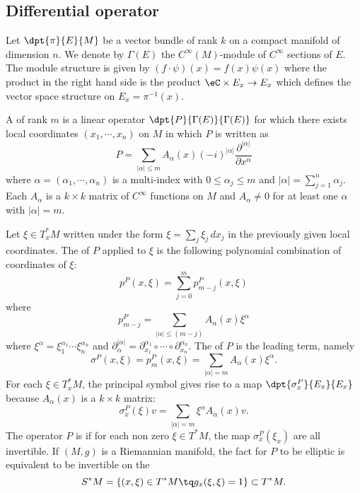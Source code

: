 \subsection{Differential operator}

Let $\dpt{ \pi }{ E }{ M }$ be a vector bundle of rank $k$ on a compact manifold of dimension $n$. We denote by $\Gamma(E)$ the $ C^{\infty}(M)$-module of $ C^{\infty}$ sections of $E$. The module structure is given by $(f\cdot\psi)(x)=f(x)\psi(x)$ where the product in the right hand side is the product $\eC\times E_x\to E_x$ which defines the vector space structure on $E_x=\pi^{-1}(x)$.

A  of rank $m$  is a linear operator $\dpt{ P }{ \Gamma(E) }{ \Gamma(E) }$ for which there exists local coordinates $(x_1,\cdots,x_n)$ on $M$ in which $P$ is written as
\begin{equation}
P=\sum_{| \alpha |\leq m}A_{\alpha}(x)(-i)^{| \alpha |}\frac{ \partial^{| \alpha |} }{ \partial x^{\alpha} }
\end{equation}
where $\alpha=(\alpha_1,\cdots,\alpha_n)$ is a multi-index with $0\leq\alpha_j\leq m$ and $| \alpha |=\sum_{j=1}^n\alpha_j$. Each $A_{\alpha}$ is a $k\times k$ matrix of $ C^{\infty}$ functions on $M$ and $A_{\alpha}\neq 0$ for at least one $\alpha$ with $| \alpha |=m$.

Let $\xi\in T^*_xM$ written under the form $\xi=\sum_j\xi_j\,dx_j$ in the previously given local coordinates. The  of $P$ applied to $\xi$ is the following polynomial combination of coordinates of $\xi$:
\begin{equation}
p^P(x,\xi)=\sum_{j=0}^m p^P_{m-j}(x,\xi)
\end{equation}
where
\[ 
  p^P_{m-j}=\sum_{| \alpha |\leq(m-j)}A_{\alpha}(x)\xi^{\alpha}
\]
where $\xi^{\alpha}=\xi_1^{\alpha_1}\cdots\xi_n^{\alpha_n}$ and $\partial^{| \alpha |}_{\alpha}=\partial_{x_1}^{\alpha_1}\circ\cdots\circ\partial^{\alpha_n}_{x_n}$.  The  of $P$ is the leading term, namely
\begin{equation}
\sigma^P(x,\xi)=p^P_m(x,\xi)=\sum_{| \alpha |=m}A_{\alpha}(x)\xi^{\alpha}.
\end{equation}
For each $\xi\in T^*_xM$, the principal symbol gives rise to a map $\dpt{ \sigma_x^P }{ E_x }{ E_x }$ because $A_{\alpha}(x)$ is a $k\times k$ matrix:
\[ 
  \sigma_x^P(\xi)v=\sum_{| \alpha |=m}\xi^{\alpha}A_{\alpha}(x)v.
\]
The operator $P$ is  if for each non zero $\xi\in T^*M$, the map $\sigma_x^P(\xi_x)$ are all invertible. If $(M,g)$ is a Riemannian manifold, the fact for $P$ to be elliptic is equivalent to be invertible on the 
\[ 
  S^*M=\{ (x,\xi)\in T^*M\tq g_x(\xi,\xi)=1 \}\subset T^*M.
\]

